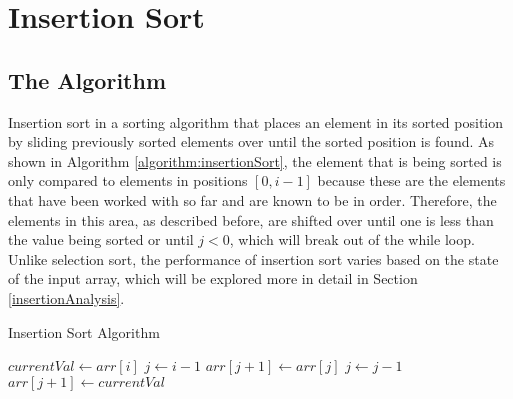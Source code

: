 \documentclass[letterpaper, 10pt,DIV=13]{scrartcl}
\numberwithin{equation}{section} %
\numberwithin{figure}{section} %
\numberwithin{table}{section} %
\begin{document}
\section{Insertion Sort}\label{insertionSortSection}
\subsection{The Algorithm}\label{insertionSortAlgo}
Insertion sort in a sorting algorithm that places an element in its sorted position by sliding previously sorted elements over until the sorted position is found. As shown in Algorithm \ref{algorithm:insertionSort}, the element that is being sorted is only compared to elements in positions $[0, i - 1]$ because these are the elements that have been worked with so far and are known to be in order. Therefore, the elements in this area, as described before, are shifted over until one is less than the value being sorted or until $j < 0$, which will break out of the while loop. Unlike selection sort, the performance of insertion sort varies based on the state of the input array, which will be explored more in detail in Section \ref{insertionAnalysis}.

\begin{algorithm}
  \caption{Insertion Sort Algorithm}
  \label{algorithm:insertionSort}
  \begin{algorithmic}[1]
         
          \State $currentVal \gets arr[i]$
          \State $j \gets i - 1$
           
            \State $arr[j + 1] \gets arr[j]$ 
            \State $j \gets j - 1$
          \EndWhile
          \State $arr[j + 1] \gets currentVal$ 
        \EndFor
      \EndProcedure
  \end{algorithmic}
\end{algorithm}
\end{document}
